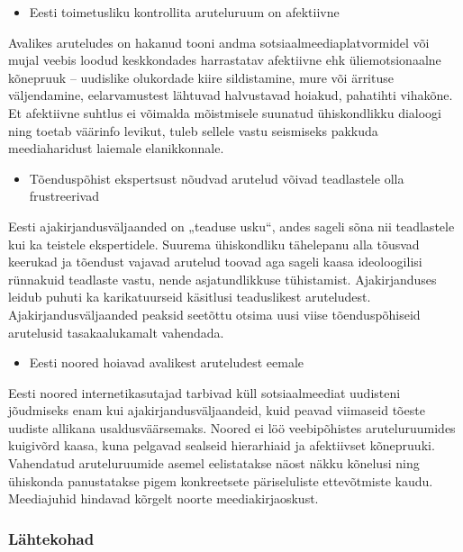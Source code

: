 \documentclass[estonian,]{article}
\providecommand{\tightlist}{%
  \setlength{\itemsep}{0pt}\setlength{\parskip}{0pt}}
\begin{document}
\begin{points}
\begin{itemize}
\tightlist
\item
  Eesti toimetusliku kontrollita aruteluruum on afektiivne
\end{itemize}

Avalikes aruteludes on hakanud tooni andma sotsiaalmeediaplatvormidel
või mujal veebis loodud keskkondades harrastatav afektiivne ehk
üliemotsionaalne kõnepruuk -- uudislike olukordade kiire sildistamine,
mure või ärrituse väljendamine, eelarvamustest lähtuvad halvustavad
hoiakud, pahatihti vihakõne. Et afektiivne suhtlus ei võimalda
mõistmisele suunatud ühiskondlikku dialoogi ning toetab väärinfo
levikut, tuleb sellele vastu seismiseks pakkuda meediaharidust laiemale
elanikkonnale.

\begin{itemize}
\tightlist
\item
  Tõenduspõhist ekspertsust nõudvad arutelud võivad teadlastele olla
  frustreerivad
\end{itemize}

Eesti ajakirjandusväljaanded on „teaduse usku``, andes sageli sõna nii
teadlastele kui ka teistele ekspertidele. Suurema ühiskondliku
tähelepanu alla tõusvad keerukad ja tõendust vajavad arutelud toovad aga
sageli kaasa ideoloogilisi rünnakuid teadlaste vastu, nende
asjatundlikkuse tühistamist. Ajakirjanduses leidub puhuti ka
karikatuurseid käsitlusi teaduslikest aruteludest.
Ajakirjandusväljaanded peaksid seetõttu otsima uusi viise
tõenduspõhiseid arutelusid tasakaalukamalt vahendada.

\begin{itemize}
\tightlist
\item
  Eesti noored hoiavad avalikest aruteludest eemale
\end{itemize}

Eesti noored internetikasutajad tarbivad küll sotsiaalmeediat uudisteni
jõudmiseks enam kui ajakirjandusväljaandeid, kuid peavad viimaseid
tõeste uudiste allikana usaldusväärsemaks. Noored ei löö veebipõhistes
aruteluruumides kuigivõrd kaasa, kuna pelgavad sealseid hierarhiaid ja
afektiivset kõnepruuki. Vahendatud aruteluruumide asemel eelistatakse
näost näkku kõnelusi ning ühiskonda panustatakse pigem konkreetsete
päriseluliste ettevõtmiste kaudu. Meediajuhid hindavad kõrgelt noorte
meediakirjaoskust.
\end{points}

\hypertarget{luxe4htekohad-2}{%
\subsubsection*{Lähtekohad}\label{luxe4htekohad-2}}
\end{document}
